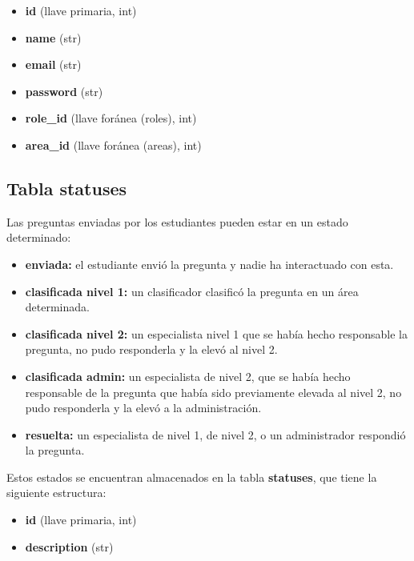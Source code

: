 \begin{itemize}
	\item \textbf{id} (llave primaria, int)
	\item \textbf{name} (str)
	\item \textbf{email} (str)
	\item \textbf{password} (str)
	\item \textbf{role\_id} (llave foránea (roles), int)
	\item \textbf{area\_id} (llave foránea (areas), int)
\end{itemize}

\subsection{Tabla statuses}

Las preguntas enviadas por los estudiantes pueden estar en un estado determinado:

\begin{itemize}
	\item \textbf{enviada:} el estudiante envió la pregunta y nadie ha interactuado con esta.
	
	\item \textbf{clasificada nivel 1:} un clasificador clasificó la pregunta en un área determinada.
	
	\item \textbf{clasificada nivel 2:} un especialista nivel 1 que se había hecho responsable la pregunta, no pudo responderla y la elevó al nivel 2.
	
	\item \textbf{clasificada admin:} un especialista de nivel 2, que se había hecho responsable de la pregunta que había sido previamente elevada al nivel 2, no pudo responderla y la elevó a la administración.
	
	\item \textbf{resuelta:} un especialista de nivel 1, de nivel 2, o un administrador respondió la pregunta.
	
\end{itemize}

Estos estados se encuentran almacenados en la tabla \textbf{statuses}, que tiene la siguiente estructura:

\begin{itemize}
	\item \textbf{id} (llave primaria, int)
	\item \textbf{description} (str)
\end{itemize}

